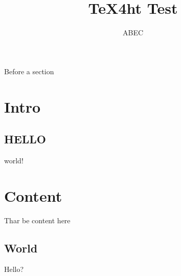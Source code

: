 \documentclass{book}
\title{TeX4ht Test}
\author{ABEC}
\begin{document}
\maketitle

\ifdefined\HCode\else\tableofcontents\fi

Before a section

\section{Intro}
\subsection{HELLO}
world!

\section{Content}
Thar be content here
\subsection{World}
Hello?
\end{document}
